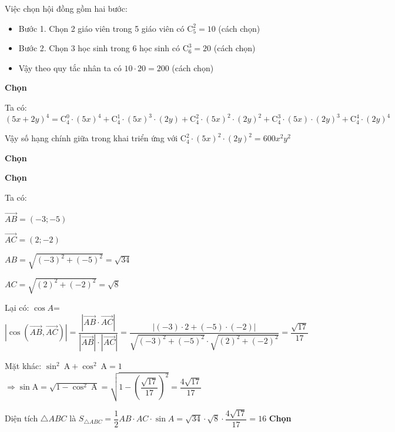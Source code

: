 \begin{loigiaiex}{5}
  Việc chọn hội đồng gồm hai bước: \begin {itemize} \item Bước 1. Chọn 2 giáo viên trong 5 giáo viên có $\mathrm {C}_5^2 =10$ (cách chọn) \item Bước 2. Chọn 3 học sinh trong 6 học sinh có $\mathrm {C}_6^3 =20$ (cách chọn) \item Vậy theo quy tắc nhân ta có $10\cdot 20=200$ (cách chọn) \end {itemize}  \phantom {a}\hfill {\bfseries \sffamily Chọn~} 
\end{loigiaiex}
\begin{loigiaiex}{6}
  \par Ta có: \[(5x+2y)^4 =\mathrm {C}_4^0\cdot (5x)^4+\mathrm {C}_4^1\cdot (5x)^3\cdot (2y)+\mathrm {C}_4^2\cdot (5x)^2\cdot (2y)^2+\mathrm {C}_4^3\cdot (5x)\cdot (2y)^3+\mathrm {C}_4^4\cdot (2y)^4\] \par Vậy số hạng chính giữa trong khai triển ứng với $\mathrm {C}_4^2\cdot (5x)^2\cdot (2y)^2= 600x^2y^2$ \par  \phantom {a}\hfill {\bfseries \sffamily Chọn~} 
\end{loigiaiex}
\begin{loigiaiex}{7}
  \phantom {a}\hfill {\bfseries \sffamily Chọn~} 
\end{loigiaiex}
\begin{loigiaiex}{8}
  \par Ta có: \par $\overrightarrow {AB}=(-3;-5) $ \par $\overrightarrow {AC}=(2;-2) $ \par $AB=\sqrt {(-3)^2 +(-5)^2}= \sqrt {34}$ \par $AC=\sqrt {(2)^2 +(-2)^2}= \sqrt {8}$ \par Lại có: $\cos A$=$|\cos (\overrightarrow {AB},\overrightarrow {AC})|=\dfrac {|\overrightarrow {AB}\cdot \overrightarrow {AC}|}{|\overrightarrow {AB}|\cdot |\overrightarrow {AC}|}=\dfrac {|(-3)\cdot 2+ (-5)\cdot (-2)|}{\sqrt {(-3)^2+(-5)^2}\cdot \sqrt {(2)^2+(-2)^2}}=\dfrac {\sqrt {17}}{17}$ \par \par \par Mặt khác: $\sin ^2 \mathrm {~A}+\cos ^2 \mathrm {~A}=1$ $ \Rightarrow \sin \mathrm {A}=\sqrt {1-\cos ^2 \mathrm {~A}}=\sqrt {1-\left (\dfrac {\sqrt {17}}{17}\right )^2}=\dfrac {4\sqrt {17}}{17} $ \par Diện tích $\triangle ABC$ là $S_{\triangle ABC}=\dfrac {1}{2}AB\cdot AC \cdot \sin A = \sqrt {34}\cdot \sqrt {8}\cdot \dfrac {4\sqrt {17}}{17} =16$  \phantom {a}\hfill {\bfseries \sffamily Chọn~} 
\end{loigiaiex}
